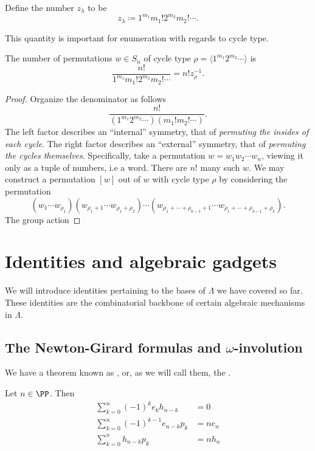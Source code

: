 \documentclass{article}
\begin{document}
\begin{definition}
    Define the number $z_\lambda$ to be
    \[
        z_\lambda \coloneq 1^{m_1}m_1!2^{m_2}m_2!\cdots.
    \]
\end{definition}

This quantity is important for enumeration with regards to cycle type.

\begin{theorem}
    The number of permutations $w \in S_n$ of cycle type $\rho = \langle 1^{m_1}2^{m_2}\cdots\rangle$ is
    \[
        \frac{n!}{1^{m_1}m_1!2^{m_2}m_2!\cdots} = n!z_\rho^{-1}.
    \]
\end{theorem}

\begin{proof}
    Organize the denominator as follows
    \[
        \frac{n!}{(1^{m_1}2^{m_2}\cdots)(m_1!m_2!\cdots)}.
    \]
    The left factor describes an ``internal'' symmetry, that of \textit{permuting the insides of each cycle}. 
    The right factor describes an ``external'' symmetry, that of \textit{permuting the cycles themselves}.
    Specifically, take a permutation $w = w_1w_2\cdots w_n$, viewing it only as a tuple of numbers, i.e a word.
    There are $n!$ many such $w$.
    We may construct a permutation $[w]$ out of $w$ with cycle type $\rho$ by considering the permutation
    \[
        (w_1\cdots w_{\rho_1})
        (w_{\rho_1+1}\cdots w_{\rho_1+\rho_2})\cdots(w_{\rho_1+\cdots+\rho_{k-1}+1}\cdots w_{\rho_1+\cdots+\rho_{k-1}+\rho_k}).
    \]
    The group action 
\end{proof}

\section{Identities and algebraic gadgets}

We will introduce identities pertaining to the bases of $\Lambda$ we have covered so far.
These identities are the combinatorial backbone of certain algebraic mechanisms in $\Lambda$.

\subsection{
    The Newton-Girard formulas
    and $\omega$-involution
}

We have a theorem known as , or, as we will call them, the .

\begin{theorem}
    Let $n \in \PP$. Then
    \begin{align}
        \sum_{k=0}^n (-1)^k e_kh_{n-k} &= 0 \label{ng1} \\
        \sum_{k=0}^n (-1)^{k-1} e_{n-k}p_k &= ne_n  \label{ng2} \\
        \sum_{k=0}^n h_{n-k}p_k &= nh_n \label{eq:ng3}
    \end{align}
\end{theorem}
\end{document}
